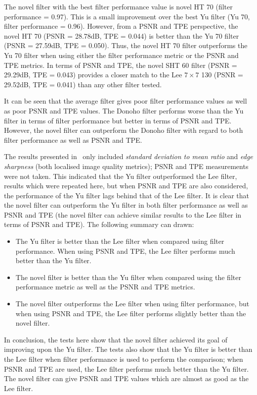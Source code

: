 \documentclass[12pt]{report}
\begin{document}
The novel filter with the best filter performance value is novel HT 70 (filter performance = 0.97). 
This is a small improvement over the best Yu filter (Yu 70, filter performance = 0.96).
However, from a PSNR and TPE perspective, the novel HT 70 (PSNR = 28.78dB, TPE = 0.044) is better than the
Yu 70 filter (PSNR = 27.59dB, TPE = 0.050). Thus, the novel HT 70 filter outperforms the Yu 70 filter when using 
either the filter performance metric or the PSNR and TPE metrics.
In terms of PSNR and TPE, the novel SHT 60 filter (PSNR = 29.29dB, TPE = 0.043) provides a 
closer match to the Lee $7 \times 7$ 130 (PSNR = 29.52dB, TPE = 0.041)
than any other filter tested. 

It can be seen that the average filter gives poor filter performance values as well as poor PSNR and TPE values.
The Donoho filter performs worse than the Yu filter in terms of filter performance but better in terms of PSNR and TPE.
However, the novel filter can outperform the Donoho filter with regard to both filter performance as well as PSNR and TPE.

The results presented in~\cite{yu96} only included \emph{standard deviation to mean ratio} and \emph{edge sharpness} (both
localised image quality metrics); PSNR and TPE measurements were not taken.
This indicated that the Yu filter outperformed the Lee filter, results which were repeated here, but when PSNR and TPE are also
considered, the performance of the Yu filter lags behind that of the Lee filter. 
It is clear that the novel filter can outperform the Yu filter in both filter performance as well as 
PSNR and TPE (the novel filter can achieve similar results to the Lee filter in terms of PSNR and TPE). 
The following summary can drawn:
\begin{itemize}
	\item 	The Yu filter is better than the Lee filter when compared using filter performance. 
		When using PSNR and TPE, the Lee filter performs much better than the Yu filter.
	\item 	The novel filter is better than the Yu filter when compared using the filter performance metric
		as well as the PSNR and TPE metrics.
	\item	The novel filter outperforms the Lee filter when using filter performance, but 
		when using PSNR and TPE, the Lee filter performs slightly better than the novel filter.
\end{itemize}
In conclusion, the tests here show that the novel filter achieved its goal of improving upon the Yu filter.
The tests also show that the Yu filter is better than the Lee filter when filter performance is
used to perform the comparison; when PSNR and TPE are used, the Lee filter performs much better
than the Yu filter. The novel filter can give PSNR and TPE values which are almost as good as the Lee filter. 
\end{document}

